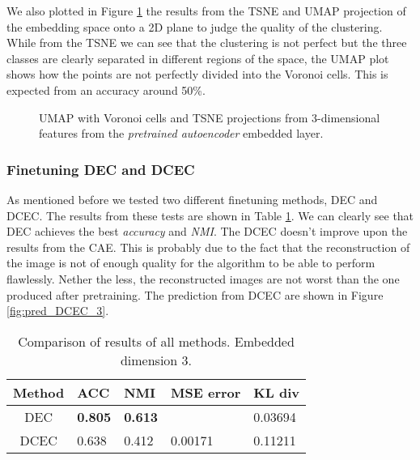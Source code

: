 We also plotted in Figure \ref{fig:TSNE_UMAP_3} the results from the TSNE and UMAP projection of the embedding space onto a 2D plane to judge the quality of the clustering. While from the TSNE we can see that the clustering is not perfect but the three classes are clearly separated in different regions of the space, the UMAP plot shows how the points are not perfectly divided into the Voronoi cells. This is expected from an accuracy around 50\%.

\begin{figure}[H]
    \centering
    
    
    \caption{UMAP with Voronoi cells and TSNE projections from 3-dimensional features from the \textit{pretrained autoencoder} embedded layer. }
    \label{fig:TSNE_UMAP_3}
\end{figure}

\subsubsection{Finetuning DEC and DCEC}

As mentioned before we tested two different finetuning methods, DEC and DCEC. The results from these tests are shown in Table \ref{table:result_3}. We can clearly see that DEC achieves the best \textit{accuracy} and \textit{NMI}. The DCEC doesn't improve upon the results from the CAE. This is probably due to the fact that the reconstruction of the image is not of enough quality for the algorithm to be able to perform flawlessly. Nether the less, the reconstructed images are not worst than the one produced after pretraining. The prediction from DCEC are shown in Figure \ref{fig:pred_DCEC_3}.

\begin{table}[H]
\centering
\begin{tabular}{c|llll} \hline
\textbf{Method} & \textbf{ACC} & \textbf{NMI} & \textbf{MSE error} & \textbf{KL div} \\ \hline
DEC  & \textbf{0.805}  & \textbf{0.613} &  & 0.03694 \\ \hline
DCEC & 0.638  & 0.412 & 0.00171 & 0.11211  \\ \hline
\end{tabular}
\caption{Comparison of results of all methods. Embedded dimension 3.}
\label{table:result_3}
\end{table}

